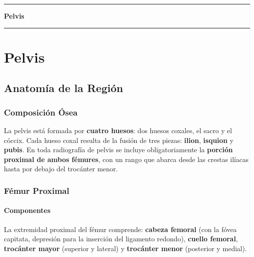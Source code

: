 \clearpage
\onecolumn
\thispagestyle{empty}
\vspace*{\fill}
\begin{center}
	{\color{radblue}\rule{\linewidth}{2pt}}\par
	\vspace{6mm}
	{\Huge\bfseries\color{radblue} Pelvis}\par
	\vspace{6mm}
	{\color{radblue}\rule{\linewidth}{2pt}}
\end{center}
\vspace*{\fill}
\clearpage
\twocolumn
\pagestyle{contenido}


	
	\section{Pelvis}
	
	\subsection{Anatomía de la Región}
	
	\subsubsection*{Composición Ósea}
	
	La pelvis está formada por \textbf{cuatro huesos}: dos huesos coxales, el sacro y el cóccix.
	Cada hueso coxal resulta de la fusión de tres piezas: \textbf{ilion}, \textbf{isquion} y \textbf{pubis}.
	En toda radiografía de pelvis se incluye obligatoriamente la \textbf{porción proximal de ambos fémures},
	con un rango que abarca desde las crestas ilíacas hasta por debajo del trocánter menor.
	
	\subsubsection*{Fémur Proximal}
	
	\paragraph{Componentes}
	La extremidad proximal del fémur comprende: \textbf{cabeza femoral} (con la fóvea capitata, depresión
	para la inserción del ligamento redondo), \textbf{cuello femoral}, \textbf{trocánter mayor}
	(superior y lateral) y \textbf{trocánter menor} (posterior y medial).
	
